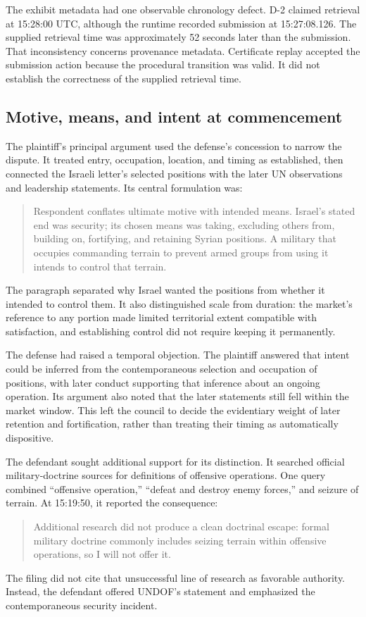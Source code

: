 \documentclass[11pt]{article}
\begin{document}
The exhibit metadata had one observable chronology defect.  D-2 claimed retrieval at 15:28:00 UTC, although the runtime recorded submission at 15:27:08.126.  The supplied retrieval time was approximately 52 seconds later than the submission.  That inconsistency concerns provenance metadata.  Certificate replay accepted the submission action because the procedural transition was valid.  It did not establish the correctness of the supplied retrieval time.

\subsection{Motive, means, and intent at commencement}

The plaintiff's principal argument used the defense's concession to narrow the dispute.  It treated entry, occupation, location, and timing as established, then connected the Israeli letter's selected positions with the later UN observations and leadership statements.  Its central formulation was:
\begin{quote}
Respondent conflates ultimate motive with intended means. Israel's stated end was security; its chosen means was taking, excluding others from, building on, fortifying, and retaining Syrian positions. A military that occupies commanding terrain to prevent armed groups from using it intends to control that terrain.
\end{quote}
The paragraph separated why Israel wanted the positions from whether it intended to control them.  It also distinguished scale from duration: the market's reference to any portion made limited territorial extent compatible with satisfaction, and establishing control did not require keeping it permanently.

The defense had raised a temporal objection.  The plaintiff answered that intent could be inferred from the contemporaneous selection and occupation of positions, with later conduct supporting that inference about an ongoing operation.  Its argument also noted that the later statements still fell within the market window.  This left the council to decide the evidentiary weight of later retention and fortification, rather than treating their timing as automatically dispositive.

The defendant sought additional support for its distinction.  It searched official military-doctrine sources for definitions of offensive operations.  One query combined ``offensive operation,'' ``defeat and destroy enemy forces,'' and seizure of terrain.  At 15:19:50, it reported the consequence:
\begin{quote}
Additional research did not produce a clean doctrinal escape: formal military doctrine commonly includes seizing terrain within offensive operations, so I will not offer it.
\end{quote}
The filing did not cite that unsuccessful line of research as favorable authority.  Instead, the defendant offered UNDOF's statement and emphasized the contemporaneous security incident.
\end{document}
